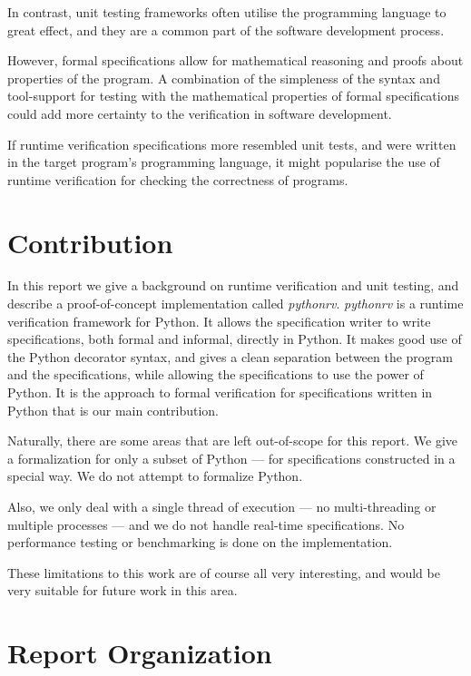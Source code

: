 \documentclass[a4paper,11pt]{kth-mag}
\theoremstyle{definition}
\begin{document}
In contrast, unit testing frameworks often utilise the programming language to
great effect, and they are a common part of the software development process.

However, formal specifications allow for mathematical reasoning and proofs
about properties of the program. A combination of the simpleness of the syntax
and tool-support for testing with the mathematical properties of formal
specifications could add more certainty to the verification in software
development.

If runtime verification specifications more resembled unit tests, and were
written in the target program's programming language, it might popularise the
use of runtime verification for checking the correctness of programs.


\section{Contribution}

In this report we give a background on runtime verification and unit testing,
and describe a proof-of-concept implementation called \textit{pythonrv}.
\textit{pythonrv} is a runtime verification framework for Python. It allows the
specification writer to write specifications, both formal and informal,
directly in Python. It makes good use of the Python decorator syntax, and gives
a clean separation between the program and the specifications, while allowing
the specifications to use the power of Python. It is the approach to formal
verification for specifications written in Python that is our main
contribution.

Naturally, there are some areas that are left out-of-scope for this report. We
give a formalization for only a subset of Python --- for specifications
constructed in a special way. We do not attempt to formalize Python.

Also, we only deal with a single thread of execution --- no multi-threading or
multiple processes --- and we do not handle real-time specifications. No
performance testing or benchmarking is done on the implementation.

These limitations to this work are of course all very interesting, and would be
very suitable for future work in this area.


\section{Report Organization}
\end{document}
